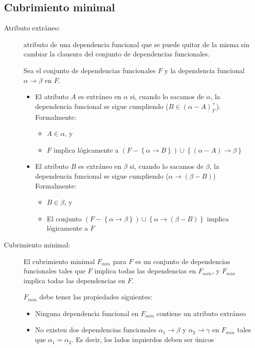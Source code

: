 \documentclass[a4paper, twoside]{article}
\begin{document}
\subsection{Cubrimiento minimal}
\begin{description}
	\item[Atributo extráneo:] atributo de una dependencia funcional que se puede quitar de la misma sin cambiar\emph{ }la clausura del conjunto de dependencias funcionales. 

	Sea el conjunto de dependencias funcionales $F$ y la dependencia funcional $\alpha\to\beta$ en $F$.
	\begin{itemize}
		\item El atributo $A$ es extráneo en $\alpha$ si, cuando lo sacamos de $\alpha$, la dependencia funcional se sigue cumpliendo ($B\in(\alpha-A)_{F}^{+}$). Formalmente:
		\begin{itemize}
			\item $A\in\alpha$, y
			\item $F$ implica lógicamente a $\left(F-\left\{ \alpha\to B\right\} \right)\cup\left\{ \left(\alpha-A\right)\to\beta\right\} $
		\end{itemize}

		\item El atributo $B$ es extráneo en $\beta$ si, cuando lo sacamos de $\beta$, la dependencia funcional se sigue cumpliendo ($\alpha\to(\beta-B)$) Formalmente:
		\begin{itemize}
			\item $B\in\beta$, y
			\item El conjunto $\left(F-\left\{ \alpha\to\beta\right\} \right)\cup\left\{ \alpha\to\left(\beta-B\right)\right\}$ implica lógicamente a $F$
		\end{itemize}
	\end{itemize}

	\item[Cubrimiento minimal:] El cubrimiento minimal $F_{min}$ para $F$ es un conjunto de dependencias funcionales tales que $F$ implica todas las dependencias en $F_{min}$, y $F_{min}$ implica todas las
dependencias en $F$.

	$F_{min}$ debe tener las propiedades siguientes:
	\begin{itemize}
		\item Ninguna dependencia funcional en $F_{min}$ contiene un atributo extráneo
		\item No existen dos dependencias funcionales $\alpha_{1}\to\beta$ y $\alpha_{2}\to\gamma$ en $F_{min}$ tales que $\alpha_{1}=\alpha_{2}$. Es decir, los lados izquierdos deben ser únicos
	\end{itemize}
\end{description}
\end{document}
